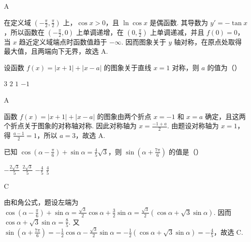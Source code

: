 \begin{answer}
A
\end{answer}

\begin{solution}
在定义域 \(\left(-\frac\pi2,\frac\pi2\right)\) 上，\(\cos x>0\)，且 \(\ln\cos x\) 是偶函数. 其导数为 \(y'=-\tan x\)，所以函数在 \(\left(-\frac\pi2,0\right)\) 上单调递增，在 \(\left(0,\frac\pi2\right)\) 上单调递减，并且 \(f(0)=0\)，当 \(x\) 趋近定义域端点时函数值趋于 \(-\infty\). 因而图象关于 \(y\) 轴对称，在原点处取得最大值，且两端向下无界，故选 A.
\end{solution}

\begin{problem}
设函数 \(f(x) = |x + 1| + |x - a|\) 的图象关于直线 \(x = 1\) 对称，则 \(a\) 的值为（\quad）

\choices
    {\(3\)}
    {\(2\)}
    {\(1\)}
    {\(-1\)}
\end{problem}

\begin{answer}
A
\end{answer}

\begin{solution}
函数 \(f(x)=|x+1|+|x-a|\) 的图象由两个折点 \(x=-1\) 和 \(x=a\) 确定，且这两个折点关于图象的对称轴对称. 因此对称轴为 \(x=\frac{-1+a}{2}\). 由题设对称轴为 \(x=1\)，得 \(\frac{a-1}{2}=1\)，所以 \(a=3\)，故选 A.
\end{solution}

\begin{problem}
已知 \(\cos \left(\alpha - \frac{\pi}{6}\right) + \sin \alpha = \frac{4}{5}\sqrt{3}\)，则 \(\sin \left(\alpha + \frac{7\pi}{6}\right)\) 的值是（\quad）

\choices
    {\(-\frac{2\sqrt{3}}{5}\)}
    {\(\frac{2\sqrt{3}}{5}\)}
    {\(-\frac{4}{5}\)}
    {\(\frac{4}{5}\)}
\end{problem}

\begin{answer}
C
\end{answer}

\begin{solution}
由和角公式，题设左端为 \(\cos\left(\alpha-\frac\pi6\right)+\sin\alpha=\frac{\sqrt3}{2}\cos\alpha+\frac32\sin\alpha=\frac{\sqrt3}{2}\left(\cos\alpha+\sqrt3\sin\alpha\right)\). 因而 \(\cos\alpha+\sqrt3\sin\alpha=\frac85\). 又 \(\sin\left(\alpha+\frac{7\pi}{6}\right)=-\frac12\cos\alpha-\frac{\sqrt3}{2}\sin\alpha=-\frac12\left(\cos\alpha+\sqrt3\sin\alpha\right)=-\frac45\)，故选 C.
\end{solution}

